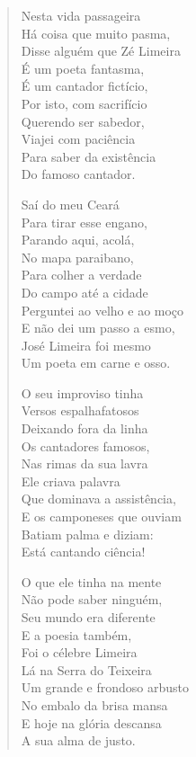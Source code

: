 \begin{verse}
Nesta vida passageira\\
Há coisa que muito pasma,\\
Disse alguém que Zé Limeira\\
É um poeta fantasma,\\
É um cantador fictício,\\
Por isto, com sacrifício\\
Querendo ser sabedor,\\
Viajei com paciência\\
Para saber da existência\\
Do famoso cantador.

Saí do meu Ceará\\
Para tirar esse engano,\\
Parando aqui, acolá,\\
No mapa paraibano,\\
Para colher a verdade\\
Do campo até a cidade\\
Perguntei ao velho e ao moço\\
E não dei um passo a esmo,\\
José Limeira foi mesmo\\
Um poeta em carne e osso.

O seu improviso tinha\\
Versos espalhafatosos\\
Deixando fora da linha\\
Os cantadores famosos,\\
Nas rimas da sua lavra\\
Ele criava palavra\\
Que dominava a assistência,\\
E os camponeses que ouviam\\
Batiam palma e diziam:\\
Está cantando ciência!

O que ele tinha na mente\\
Não pode saber ninguém,\\
Seu mundo era diferente\\
E a poesia também,\\
Foi o célebre Limeira\\
Lá na Serra do Teixeira\\
Um grande e frondoso arbusto\\
No embalo da brisa mansa\\
E hoje na glória descansa\\
A sua alma de justo.


\end{verse}
